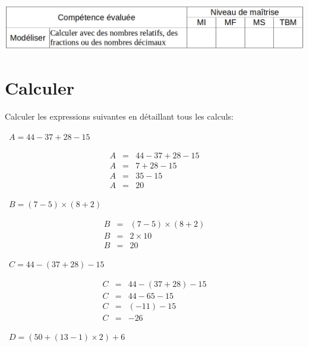 	\includegraphics[scale=0.4]{competences}

\section{Calculer}
Calculer les expressions suivantes en détaillant tous les calculs:
\begin{questions}
	
	
	\question[2]  $A = 44 - 37 + 28 - 15$
	
	{\LARGE \begin{solution}
		\begin{eqnarray*}
		A &=& 44 - 37 + 28 - 15 \\
		A &=& 7 + 28 - 15 \\
		A &=& 35 -15 \\
		A &=& 20
		\end{eqnarray*}
	\end{solution}}
	
	
	
{\LARGE 	\question[2]  $B = (7 - 5) \times (8 + 2)$}
	
	{\LARGE \begin{solution}
		\begin{eqnarray*}
		B &=& (7 - 5) \times (8 + 2)\\
		B &=& 2 \times 10 \\			
		B &=& 20
		\end{eqnarray*}
	\end{solution}}
	
	\newpage
	{\LARGE \question[2]  $C = 44 - (37 + 28) - 15$}
	
	{\LARGE \begin{solution}
		\begin{eqnarray*}
		C &=&  44 - (37 + 28) - 15\\
		C &=&  44 - 65 - 15\\
		C &=& (- 11) - 15\\
		C &=& - 26
		\end{eqnarray*}
	\end{solution}
	}
	
	
	{\LARGE \question[2]  $D = (50 + (13 - 1) \times 2) + 6$}
	

\end{questions}
